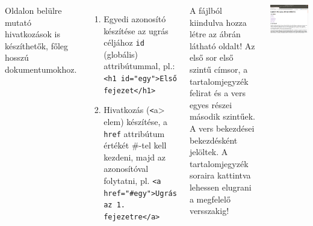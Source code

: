 \begin{frame}
  \begin{columns}[c]
    \footnotesize
      Oldalon belülre mutató hivatkozások is készíthetők, főleg hosszú dokumentumokhoz.
      \begin{enumerate}
        \item Egyedi azonosító készítése az ugrás céljához \texttt{id} (globális) attribútummal, pl.: \texttt{<h1 id="egy">Első fejezet</h1>}
        \item Hivatkozás (\texttt<a> elem) készítése, a \texttt{href} attribútum értékét \#-tel kell kezdeni, majd az azonosítóval folytatni, pl. \texttt{<a href="\#egy">Ugrás az 1. fejezetre</a>}
      \end{enumerate}
      \vfill
      A  fájlból kiindulva hozza létre az ábrán látható oldalt! Az első sor első szintű címsor, a tartalomjegyzék felirat és a vers egyes részei második szintűek. A vers bekezdései bekezdésként jelöltek. A tartalomjegyzék soraira kattintva lehessen elugrani a megfelelő versszakig!
      \begin{center}
        \begin{exampleblock}{}
          \centering \includegraphics[scale=.15]{jonas.png}
        \end{exampleblock}
      \end{center}
  \end{columns}
\end{frame}

